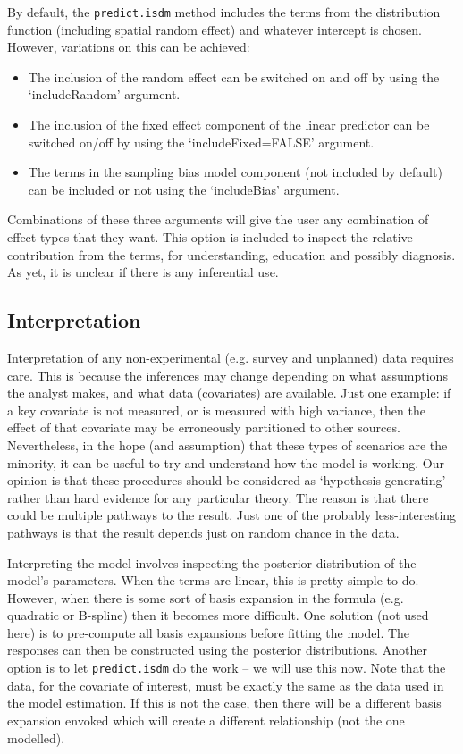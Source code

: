 \documentclass[article,shortnames,nojss]{jss}\usepackage[]{graphicx}\usepackage[]{xcolor}
\begin{document}
By default, the \texttt{predict.isdm} method includes the terms from the distribution function (including spatial random effect) and whatever intercept is chosen. However, variations on this can be achieved:
\begin{itemize}
  \item The inclusion of the random effect can be switched on and off by using the `includeRandom' argument. 
  \item The inclusion of the fixed effect component of the linear predictor can be switched on/off by using the `includeFixed=FALSE' argument.
  \item The terms in the sampling bias model component (not included by default) can be included or not using the `includeBias' argument.
\end{itemize}
Combinations of these three arguments will give the user any combination of effect types that they want. This option is included to inspect the relative contribution from the terms, for understanding, education and possibly diagnosis. As yet, it is unclear if there is any inferential use.
    
\subsection*{Interpretation} \label{subsec:inter}

Interpretation of any non-experimental (e.g. survey and unplanned) data requires care. This is because the inferences may change depending on what assumptions the analyst makes, and what data (covariates) are available. Just one example: if a key covariate is not measured, or is measured with high variance, then the effect of that covariate may be erroneously partitioned to other sources. Nevertheless, in the hope (and assumption) that these types of scenarios are the minority, it can be useful to try and understand how the model is working. Our opinion is that these procedures should be considered as `hypothesis generating' rather than hard evidence for any particular theory. The reason is that there could be multiple pathways to the result. Just one of the probably less-interesting pathways is that the result depends just on random chance in the data.

Interpreting the model involves inspecting the posterior distribution of the model's parameters. When the terms are linear, this is pretty simple to do.  However, when there is some sort of basis expansion in the formula (e.g. quadratic or B-spline) then it becomes more difficult. One solution (not used here) is to pre-compute all basis expansions before fitting the model. The responses can then be constructed using the posterior distributions. Another option is to let \texttt{predict.isdm} do the work -- we will use this now. Note that the data, for the covariate of interest, must be exactly the same as the data used in the model estimation. If this is not the case, then there will be a different basis expansion envoked which will create a different relationship (not the one modelled).
\end{document}
